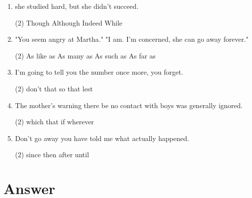 \begin{enumerate}
\item \ttu she studied hard, but she didn't succeed.
\begin{tasks}(2)
  \task Though
  \task Although
  \task Indeed
  \task While
\end{tasks}

\item "You seem angry at Martha." "I am. \ttu I'm concerned, she can go away forever."
\begin{tasks}(2)
  \task As like as
  \task As many as
  \task As such as
  \task As far as
\end{tasks}

\item I'm going to tell you the number once more, \ttu you forget.
\begin{tasks}(2)
  \task don't
  \task that
  \task so that
  \task lest
\end{tasks}

\item The mother's warning \ttu there be no contact with boys was generally ignored.
\begin{tasks}(2)
  \task which
  \task that
  \task if
  \task wherever
\end{tasks}

\item Don't go away \ttu you have told me what actually happened.
\begin{tasks}(2)
  \task since
  \task then
  \task after
  \task until
\end{tasks}

\end{enumerate}

\section{Answer}

